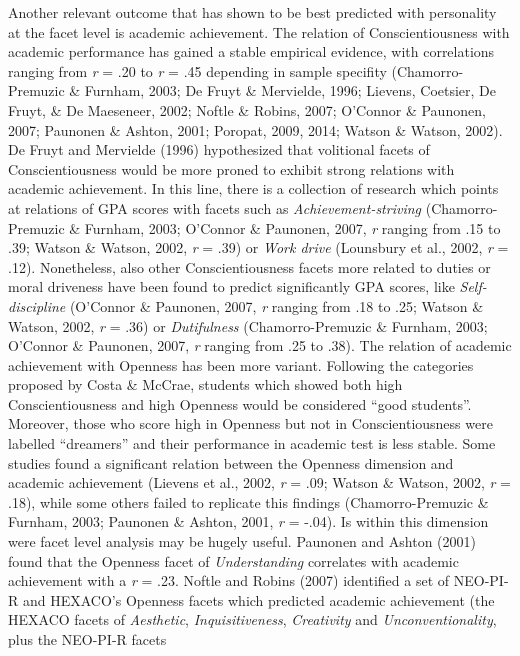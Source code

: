 \documentclass[,man,floatsintext]{apa6}
\begin{document}
Another relevant outcome that has shown to be best predicted with
personality at the facet level is academic achievement. The relation of
Conscientiousness with academic performance has gained a stable
empirical evidence, with correlations ranging from \emph{r} = .20 to
\emph{r} = .45 depending in sample specifity (Chamorro-Premuzic \&
Furnham, 2003; De Fruyt \& Mervielde, 1996; Lievens, Coetsier, De Fruyt,
\& De Maeseneer, 2002; Noftle \& Robins, 2007; O'Connor \& Paunonen,
2007; Paunonen \& Ashton, 2001; Poropat, 2009, 2014; Watson \& Watson,
2002). De Fruyt and Mervielde (1996) hypothesized that volitional facets
of Conscientiousness would be more proned to exhibit strong relations
with academic achievement. In this line, there is a collection of
research which points at relations of GPA scores with facets such as
\emph{Achievement-striving} (Chamorro-Premuzic \& Furnham, 2003;
O'Connor \& Paunonen, 2007, \emph{r} ranging from .15 to .39; Watson \&
Watson, 2002, \emph{r} = .39) or \emph{Work drive} (Lounsbury et al.,
2002, \emph{r} = .12). Nonetheless, also other Conscientiousness facets
more related to duties or moral driveness have been found to predict
significantly GPA scores, like \emph{Self-discipline} (O'Connor \&
Paunonen, 2007, \emph{r} ranging from .18 to .25; Watson \& Watson,
2002, \emph{r} = .36) or \emph{Dutifulness} (Chamorro-Premuzic \&
Furnham, 2003; O'Connor \& Paunonen, 2007, \emph{r} ranging from .25 to
.38). The relation of academic achievement with Openness has been more
variant. Following the categories proposed by Costa \& McCrae, students
which showed both high Conscientiousness and high Openness would be
considered \enquote{good students}. Moreover, those who score high in
Openness but not in Conscientiousness were labelled \enquote{dreamers}
and their performance in academic test is less stable. Some studies
found a significant relation between the Openness dimension and academic
achievement (Lievens et al., 2002, \emph{r} = .09; Watson \& Watson,
2002, \emph{r} = .18), while some others failed to replicate this
findings (Chamorro-Premuzic \& Furnham, 2003; Paunonen \& Ashton, 2001,
\emph{r} = -.04). Is within this dimension were facet level analysis may
be hugely useful. Paunonen and Ashton (2001) found that the Openness
facet of \emph{Understanding} correlates with academic achievement with
a \emph{r} = .23. Noftle and Robins (2007) identified a set of NEO-PI-R
and HEXACO's Openness facets which predicted academic achievement (the
HEXACO facets of \emph{Aesthetic}, \emph{Inquisitiveness},
\emph{Creativity} and \emph{Unconventionality}, plus the NEO-PI-R facets
\end{document}
